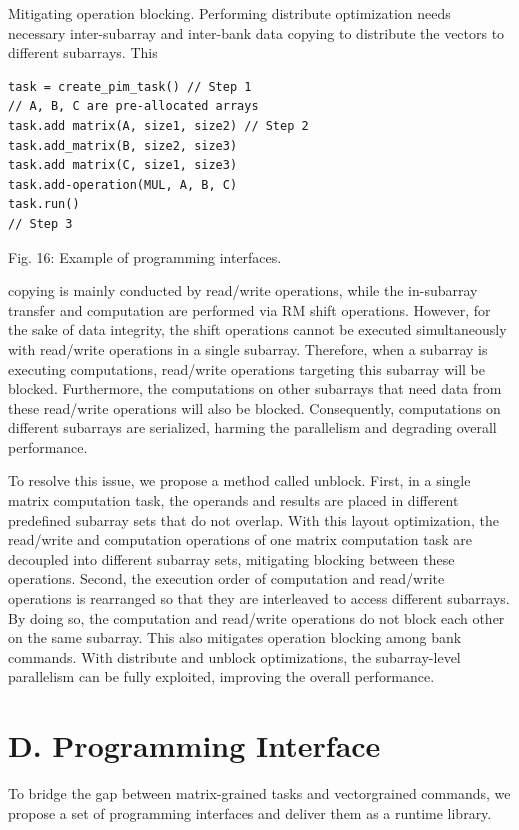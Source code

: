 \documentclass[10pt]{article}
\begin{document}
Mitigating operation blocking. Performing distribute optimization needs necessary inter-subarray and inter-bank data copying to distribute the vectors to different subarrays. This

\begin{verbatim}
task = create_pim_task() // Step 1
// A, B, C are pre-allocated arrays
task.add matrix(A, size1, size2) // Step 2
task.add_matrix(B, size2, size3)
task.add matrix(C, size1, size3)
task.add-operation(MUL, A, B, C)
task.run()
// Step 3
\end{verbatim}

Fig. 16: Example of programming interfaces.

copying is mainly conducted by read/write operations, while the in-subarray transfer and computation are performed via RM shift operations. However, for the sake of data integrity, the shift operations cannot be executed simultaneously with read/write operations in a single subarray. Therefore, when a subarray is executing computations, read/write operations targeting this subarray will be blocked. Furthermore, the computations on other subarrays that need data from these read/write operations will also be blocked. Consequently, computations on different subarrays are serialized, harming the parallelism and degrading overall performance.

To resolve this issue, we propose a method called unblock. First, in a single matrix computation task, the operands and results are placed in different predefined subarray sets that do not overlap. With this layout optimization, the read/write and computation operations of one matrix computation task are decoupled into different subarray sets, mitigating blocking between these operations. Second, the execution order of computation and read/write operations is rearranged so that they are interleaved to access different subarrays. By doing so, the computation and read/write operations do not block each other on the same subarray. This also mitigates operation blocking among bank commands. With distribute and unblock optimizations, the subarray-level parallelism can be fully exploited, improving the overall performance.

\section*{D. Programming Interface}
To bridge the gap between matrix-grained tasks and vectorgrained commands, we propose a set of programming interfaces and deliver them as a runtime library.
\end{document}
